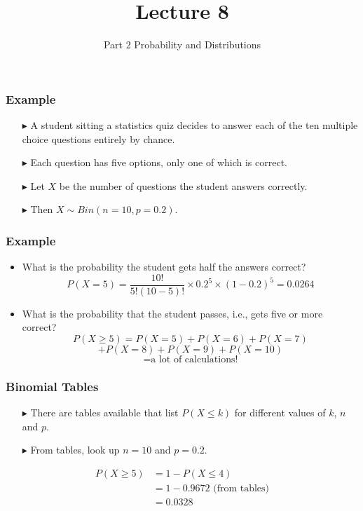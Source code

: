 \documentclass[12pt]{beamer}
\title[ECON2843]{Lecture 8}
\subtitle{Part 2 Probability and Distributions}
\date{}
\begin{document}
	\begin{frame}
		\titlepage
	\end{frame}

\begin{frame}
	\frametitle{Example}
	
	\begin{itemize}
		\item[\color{blue}$\blacktriangleright$] A student sitting a statistics quiz decides to answer each of the ten multiple choice questions entirely by chance.
		
		\item[\color{blue}$\blacktriangleright$]Each question has five options, only one of which is correct.
		
		\item[\color{blue}$\blacktriangleright$]Let $X$ be the number of questions the student answers correctly.
		
		\item[\color{blue}$\blacktriangleright$]Then $X \sim Bin(n = 10, p = 0.2)$.
	\end{itemize}
	
\end{frame}
\begin{frame}
	\frametitle{Example}
	
	\begin{itemize}
		\item What is the probability the student gets half the answers correct?
		\[ P(X = 5) = \frac{10!}{5!(10-5)!} \times 0.2^5 \times (1-0.2)^5 = 0.0264 \]
		
		\item What is the probability that the student passes, i.e., gets five or more correct?
		\[ P(X \geq 5) = P(X = 5) + P(X = 6) + P(X = 7) \]
		\[ + P(X = 8) + P(X = 9) + P(X = 10) \]
		\[ = \text{a lot of calculations!} \]
	\end{itemize}
	
\end{frame}

\begin{frame}
	\frametitle{Binomial Tables}
	
	\begin{itemize}
		\item[\color{blue}$\blacktriangleright$] There are tables available that list $P(X \leq k)$ for different values of $k$, $n$ and $p$.
		\item[\color{blue}$\blacktriangleright$] From tables, look up $n = 10$ and $p = 0.2$.
	\end{itemize}
	
	\vspace{0.5cm}
	
	\begin{align*}
		P(X \geq 5) &= 1 - P(X \leq 4) \\
		&= 1 - 0.9672 \text{ (from tables)} \\
		&= 0.0328
	\end{align*}
	
\end{frame}
\end{document}
